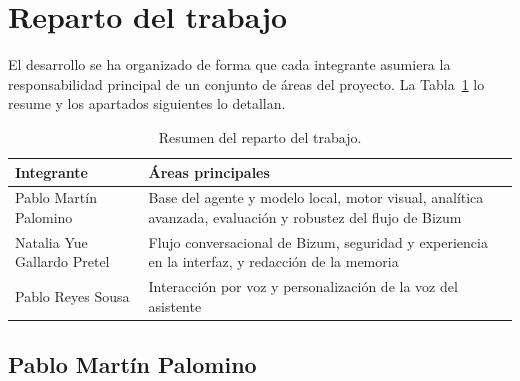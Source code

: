 \section{Reparto del trabajo}

El desarrollo se ha organizado de forma que cada integrante asumiera la
responsabilidad principal de un conjunto de áreas del proyecto. La
Tabla~\ref{tab:reparto} lo resume y los apartados siguientes lo detallan.

\begin{table}[h]
\centering
\begin{tabular}{lp{8.6cm}}
\toprule
\textbf{Integrante} & \textbf{Áreas principales} \\
\midrule
Pablo Martín Palomino
    & Base del agente y modelo local, motor visual, analítica avanzada,
      evaluación y robustez del flujo de Bizum \\[0.2cm]
Natalia Yue Gallardo Pretel
    & Flujo conversacional de Bizum, seguridad y experiencia en la interfaz,
      y redacción de la memoria \\[0.2cm]
Pablo Reyes Sousa
    & Interacción por voz y personalización de la voz del asistente \\
\bottomrule
\end{tabular}
\caption{Resumen del reparto del trabajo.}
\label{tab:reparto}
\end{table}

\subsection{Pablo Martín Palomino}

